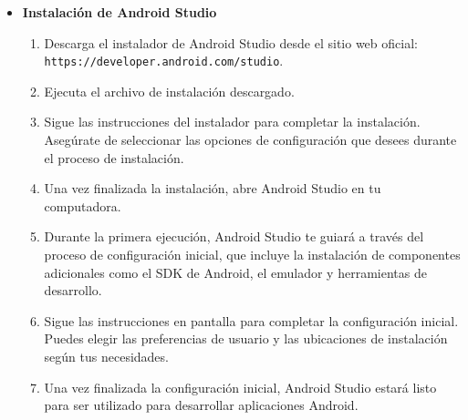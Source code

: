 \documentclass{article}
\begin{document}
    \begin{itemize}
        \item \textbf{Instalación de Android Studio}

            \begin{enumerate}
                \item Descarga el instalador de Android Studio desde el sitio web oficial: \texttt{https://developer.android.com/studio}.
                \item Ejecuta el archivo de instalación descargado.
                \item Sigue las instrucciones del instalador para completar la instalación. Asegúrate de seleccionar las opciones de configuración que desees durante el proceso de instalación.
                \item Una vez finalizada la instalación, abre Android Studio en tu computadora.
                \item Durante la primera ejecución, Android Studio te guiará a través del proceso de configuración inicial, que incluye la instalación de componentes adicionales como el SDK de Android, el emulador y herramientas de desarrollo.
                \item Sigue las instrucciones en pantalla para completar la configuración inicial. Puedes elegir las preferencias de usuario y las ubicaciones de instalación según tus necesidades.
                \item Una vez finalizada la configuración inicial, Android Studio estará listo para ser utilizado para desarrollar aplicaciones Android.
            \end{enumerate}


\end{itemize}
\end{document}

